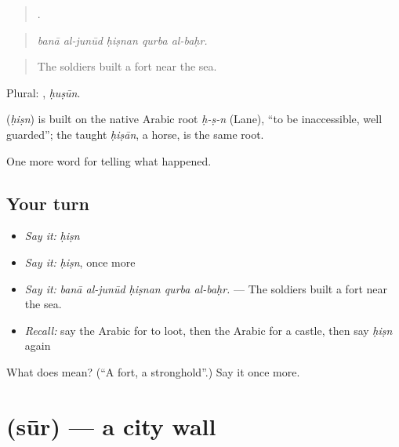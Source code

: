 \begin{quote}
    .
\end{quote}

\begin{quote}
\emph{banā al-junūd ḥiṣnan qurba al-baḥr.}
\end{quote}

\begin{quote}
The soldiers built a fort near the sea.
\end{quote}

Plural: , \emph{ḥuṣūn}.

\begin{cousinweb}
\textbf{} (\emph{ḥiṣn}) is built on the native Arabic root \emph{ḥ-ṣ-n} (Lane), \textquotedblleft{}to be inaccessible, well guarded\textquotedblright{}; the taught \emph{ḥiṣān}, a horse, is the same root.
\end{cousinweb}

\begin{grammarlens}[title={What you've built}]
One more word for telling what happened.
\end{grammarlens}

\subsection*{Your turn}
\begin{itemize}
\raggedright
  \item \emph{Say it:} \emph{ḥiṣn}
  \item \emph{Say it:} \emph{ḥiṣn}, once more
  \item \emph{Say it:} \emph{banā al-junūd ḥiṣnan qurba al-baḥr.} — The soldiers built a fort near the sea.
  \item \emph{Recall:} say the Arabic for to loot, then the Arabic for a castle, then say \emph{ḥiṣn} again
\end{itemize}

\begin{tcolorbox}[breakable,colback=teal!4,colframe=teal!35!black,title={Before you move on}]
What does  mean? (\textquotedblleft{}A fort, a stronghold\textquotedblright{}.) Say it once more.
\end{tcolorbox}
\section[\texorpdfstring{\ar{سور} (sūr)}{سور (sūr)}]{ (sūr) — a city wall}

